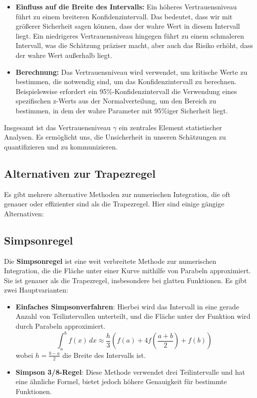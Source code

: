 \begin{itemize}
    \item \textbf{Einfluss auf die Breite des Intervalls:} Ein höheres Vertrauensniveau führt zu einem breiteren Konfidenzintervall. Das bedeutet, dass wir mit größerer Sicherheit sagen können, dass der wahre Wert in diesem Intervall liegt. Ein niedrigeres Vertrauensniveau hingegen führt zu einem schmaleren Intervall, was die Schätzung präziser macht, aber auch das Risiko erhöht, dass der wahre Wert außerhalb liegt.
    
    \item \textbf{Berechnung:} Das Vertrauensniveau wird verwendet, um kritische Werte zu bestimmen, die notwendig sind, um das Konfidenzintervall zu berechnen. Beispielsweise erfordert ein 95\%-Konfidenzintervall die Verwendung eines spezifischen z-Werts aus der Normalverteilung, um den Bereich zu bestimmen, in dem der wahre Parameter mit 95\%iger Sicherheit liegt.
\end{itemize}
Insgesamt ist das Vertrauensniveau \(\gamma\) ein zentrales Element statistischer Analysen. Es ermöglicht uns, die Unsicherheit in unseren Schätzungen zu quantifizieren und zu kommunizieren.

\subsection{Alternativen zur Trapezregel} 
\label{sec:alternativen}
Es gibt mehrere alternative Methoden zur numerischen Integration, die oft genauer oder effizienter sind als die Trapezregel. Hier sind einige gängige Alternativen:

\subsection*{Simpsonregel}
Die \textbf{Simpsonregel} ist eine weit verbreitete Methode zur numerischen Integration, die die Fläche unter einer Kurve mithilfe von Parabeln approximiert. Sie ist genauer als die Trapezregel, insbesondere bei glatten Funktionen. Es gibt zwei Hauptvarianten:

\begin{itemize}
    \item \textbf{Einfaches Simpsonverfahren}: Hierbei wird das Intervall in eine gerade Anzahl von Teilintervallen unterteilt, und die Fläche unter der Funktion wird durch Parabeln approximiert.
    \[
    \int_{a}^{b} f(x) \,dx \approx \frac{h}{3} \left( f(a) + 4f\left(\frac{a+b}{2}\right) + f(b) \right)
    \]
    wobei \(h = \frac{b-a}{2}\) die Breite des Intervalls ist.
    
    \item \textbf{Simpson 3/8-Regel}: Diese Methode verwendet drei Teilintervalle und hat eine ähnliche Formel, bietet jedoch höhere Genauigkeit für bestimmte Funktionen.
\end{itemize}

